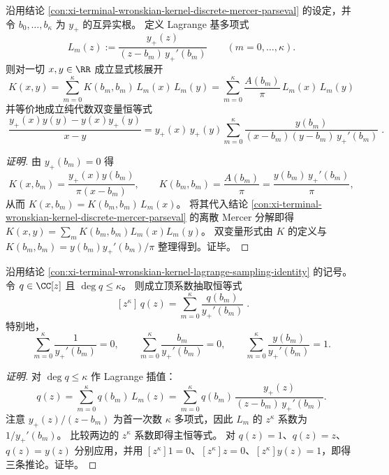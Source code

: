 \begin{conclusion}\label{con:xi-terminal-wronskian-kernel-lagrange-sampling-identity}
沿用结论 \ref{con:xi-terminal-wronskian-kernel-discrete-mercer-parseval} 的设定，并令 \(b_0,\dots,b_\kappa\) 为 \(y_{+}\) 的互异实根。
定义 Lagrange 基多项式
\[
L_m(z):=\frac{y_{+}(z)}{(z-b_m)\,y_{+}'(b_m)}\qquad (m=0,\dots,\kappa).
\]
则对一切 \(x,y\in\RR\) 成立显式核展开
\[
\boxed{\;
K(x,y)=\sum_{m=0}^{\kappa}K(b_m,b_m)\,L_m(x)\,L_m(y)
=\sum_{m=0}^{\kappa}\frac{A(b_m)}{\pi}\,L_m(x)\,L_m(y)\;}
\]
并等价地成立纯代数双变量恒等式
\[
\boxed{\;
\frac{y_{+}(x)y(y)-y(x)y_{+}(y)}{x-y}
=y_{+}(x)\,y_{+}(y)\sum_{m=0}^{\kappa}\frac{y(b_m)}{(x-b_m)(y-b_m)\,y_{+}'(b_m)}\; }.
\]
\end{conclusion}
\begin{proof}[证明]
由 \(y_{+}(b_m)=0\) 得
\[
K(x,b_m)=\frac{y_{+}(x)y(b_m)}{\pi(x-b_m)},
\qquad
K(b_m,b_m)=\frac{A(b_m)}{\pi}=\frac{y(b_m)\,y_{+}'(b_m)}{\pi},
\]
从而 \(K(x,b_m)=K(b_m,b_m)\,L_m(x)\)。
将其代入结论 \ref{con:xi-terminal-wronskian-kernel-discrete-mercer-parseval} 的离散 Mercer 分解即得
\(
K(x,y)=\sum_m K(b_m,b_m)L_m(x)L_m(y)
\)。
双变量形式由 \(K\) 的定义与 \(K(b_m,b_m)=y(b_m)y_{+}'(b_m)/\pi\) 整理得到。证毕。
\end{proof}

\begin{conclusion}\label{con:xi-terminal-wronskian-top-coefficient-extraction}
沿用结论 \ref{con:xi-terminal-wronskian-kernel-lagrange-sampling-identity} 的记号。
令 \(q\in\CC[z]\) 且 \(\deg q\le \kappa\)。
则成立顶系数抽取恒等式
\[
\boxed{\;[z^{\kappa}]\,q(z)=\sum_{m=0}^{\kappa}\frac{q(b_m)}{y_{+}'(b_m)}\; }.
\]
特别地，
\[
\sum_{m=0}^{\kappa}\frac{1}{y_{+}'(b_m)}=0,\qquad
\sum_{m=0}^{\kappa}\frac{b_m}{y_{+}'(b_m)}=0,\qquad
\sum_{m=0}^{\kappa}\frac{y(b_m)}{y_{+}'(b_m)}=1.
\]
\end{conclusion}
\begin{proof}[证明]
对 \(\deg q\le\kappa\) 作 Lagrange 插值：
\[
q(z)=\sum_{m=0}^{\kappa} q(b_m)\,L_m(z)
=\sum_{m=0}^{\kappa}q(b_m)\,\frac{y_{+}(z)}{(z-b_m)\,y_{+}'(b_m)}.
\]
注意 \(y_{+}(z)/(z-b_m)\) 为首一次数 \(\kappa\) 多项式，因此 \(L_m\) 的 \(z^\kappa\) 系数为 \(1/y_{+}'(b_m)\)。
比较两边的 \(z^\kappa\) 系数即得主恒等式。
对 \(q(z)=1\)、\(q(z)=z\)、\(q(z)=y(z)\) 分别应用，并用 \([z^\kappa]1=0\)、\([z^\kappa]z=0\)、\([z^\kappa]y(z)=1\)，即得三条推论。证毕。
\end{proof}

